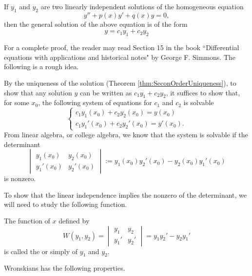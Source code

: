 \begin{theorem}\label{thm:generalsolutionlinearsecondorder}
If $y_1$ and $y_2$ are two linearly independent solutions of the homogeneous equation
\[y'' + p(x) y' + q(x) y = 0,\]
then the general solution of the above equation is of the form 
\[y=c_1 y_1 + c_2 y_2\]
\end{theorem}
For a complete proof, the reader may read Section 15 in the book ``Differential equations with applications and historical notes" by George F. Simmons. 
The following is a rough idea.

By the uniqueness of the solution (Theorem \ref{thm:SeconOrderUniqueness}), to show that any solution $y$ can be written as $c_1y_1+c_2y_2$, it suffices to show that, for some $x_0$, the following system of equations for $c_1$ and $c_2$ is solvable
  \[
    \begin{cases}
      c_{1} y_{1}(x_{0})+c_{2} y_{2}(x_{0})=y(x_{0})
      \\[0.5em]
      c_{1} y_{1}'(x_{0})+c_{2} y_{2}'(x_{0})=y'(x_{0}).
    \end{cases}
  \]
  From linear algebra, or college algebra, we know that the system is solvable if the determinant
  \begin{equation}
  \begin{vmatrix}
    y_{1}(x_{0}) & y_{2}(x_{0}) \\
  y_{1}'(x_{0}) & y_{2}'(x_{0})
  \end{vmatrix}
  :=y_{1}(x_{0}) y_{2}'(x_{0})-y_{2}(x_{0}) y_{1}'(x_{0}) \label{eq:5-1-1}
  \end{equation}
  is nonzero.

  To show that the linear independence implies the nonzero of the determinant, we will need to study the following function.

The function of $x$ defined by
\[W(y_1, y_2) = \begin{vmatrix}
  y_{1} & y_{2} \\
y_{1}' & y_{2}'
\end{vmatrix} = y_1y_2'- y_2y_1'\]
is called the  or simply  of $y_1$ and $y_2$.

Wronskians has the following properties.

